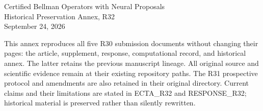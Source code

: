 \documentclass[12pt]{article}
\begin{document}
\thispagestyle{empty}
\begin{center}{\Large Certified Bellman Operators with Neural Proposals}\\[12pt]
{\large Historical Preservation Annex, R32}\\[8pt]September 24, 2026\end{center}
This annex reproduces all five R30 submission documents without changing their pages: the article, supplement, response, computational record, and historical annex. The latter retains the previous manuscript lineage. All original source and scientific evidence remain at their existing repository paths. The R31 prospective protocol and amendments are also retained in their original directory. Current claims and their limitations are stated in ECTA\_R32 and RESPONSE\_R32; historical material is preserved rather than silently rewritten.
\clearpage




\end{document}
